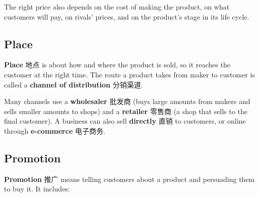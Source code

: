 \documentclass[11pt]{article}
\begin{document}
\begin{center}
\end{center}

The right price also depends on the cost of making the product, on what customers will pay, on rivals' prices, and on the product's stage in its life cycle.

\subsection*{Place}

\textbf{Place} 地点 is about how and where the product is sold, so it reaches the customer at the right time. The route a product takes from maker to customer is called a \textbf{channel of distribution} 分销渠道.

Many channels use a \textbf{wholesaler} 批发商 (buys large amounts from makers and sells smaller amounts to shops) and a \textbf{retailer} 零售商 (a shop that sells to the final customer). A business can also sell \textbf{directly} 直销 to customers, or online through \textbf{e-commerce} 电子商务.

\subsection*{Promotion}

\textbf{Promotion} 推广 means telling customers about a product and persuading them to buy it. It includes:
\end{document}

